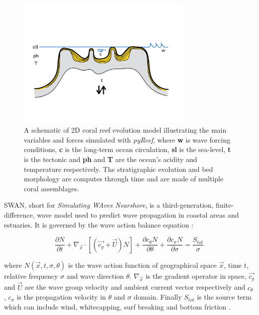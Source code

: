 \documentclass[default,jgrga]{agutex2015}
\begin{document}
\begin{article}
\begin{figure}[t]
\centering
\noindent\includegraphics[width=20pc]{figs/fig1.pdf}
\caption{A schematic of 2D coral reef evolution model illustrating the main variables and forces simulated with \textit{pyReef}, where \textbf{w} is wave forcing conditions, \textbf{c} is the long-term ocean circulation, \textbf{sl} is the sea-level, \textbf{t} is the tectonic and \textbf{ph} and \textbf{T} are the ocean's acidity and temperature respectively. The stratigraphic evolution and bed morphology are computes through time and are made of multiple coral assemblages.
}
\label{pyreef_sketch}
\end{figure}

SWAN, short for \textit{Simulating WAves Nearshore}, is a third-generation, finite-difference, wave model used to predict wave propagation in coastal areas and estuaries. It is governed by the wave action balance equation \citep{Bretherton68, Hasselmann73, Holthuijsen93, Booij99}:

\begin{equation}
 \frac{\partial N}{\partial t}+\nabla_{\vec{x}} \cdot \left[ \left( \vec{c_g} + \vec{U} \right) N \right] + \frac{\partial c_{\theta}N}{\partial \theta} + \frac{\partial c_{\sigma}N}{\partial \sigma} = \frac{S_{tot}}{\sigma}
\end{equation}

\noindent where $N(\vec{x},t,\sigma,\theta)$ is the wave action function of geographical space $\vec{x}$, time $t$, relative frequency $\sigma$ and wave direction $\theta$. $\nabla_{\vec{x}}$ is the gradient operator in space, $\vec{c_g}$ and $\vec{U}$ are the wave group velocity and ambient current vector respectively and $c_{\theta}$, $c_{\sigma}$ is the propagation velocity in $\theta$ and $\sigma$ domain. Finally $S_{tot}$ is the source term which can include wind, whitecapping, surf breaking and bottom friction \citep{Booij99}.


\end{article}
\end{document}
